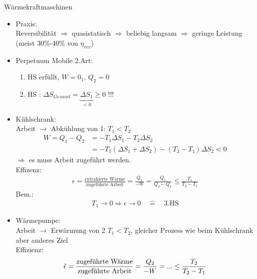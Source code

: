 \begin{beispiel}{Wärmekraftmaschinen}
\begin{itemize}
    \item Praxis:\\
            Reversibilität $\Rightarrow$ quasistatisch $\Rightarrow$ beliebig langsam $\Rightarrow$ geringe Leistung (meist 30\%-40\% von $\eta_{rev}$)
    \item Perpetuum Mobile 2.Art:
    \begin{enumerate}
        \item HS erfüllt, $W=0_1$, $Q_2=0$
        \item HS : $\Delta S_{Gesamt} = \underbrace{\Delta S_1}_{<0} \geq 0$ !!!
    \end{enumerate}
    \item Kühlschrank:\\
        Arbeit $\rightarrow$ Abkühlung von 1: $T_1<T_2$
        \begin{align}
            W=Q_1-Q_2&=-T_1\Delta S_1-T_2\Delta S_2\\
            &= -T_1(\Delta S_1 + \Delta S_2)-(T_2-T_1)\Delta S_2 < 0
        \end{align}
        $\Rightarrow$ es muss Arbeit zugeführt werden.\\
        Effizenz:
        \begin{align}
            \epsilon = \frac{\text{extrahierte Wärme}}{\text{zugeführte Arbeit}}=\frac{Q_1}{-W}=\frac{Q_1}{Q_2-Q_1}\leq \frac{T_1}{T_2-T_1}
        \end{align}
        Bem.:
        \begin{align}
            T_1 \rightarrow 0 \Rightarrow \epsilon \rightarrow 0 \quad\widehat{=} \quad\text{3.HS}
        \end{align}
    \item Wärmepumpe:\\
        Arbeit $\rightarrow$ Erwärmung von 2 $T_1<T_2$, gleicher Prozess wie beim Kühlschrank aber anderes Ziel\\
        Effizienz:
        \begin{align}
            \Tilde{\epsilon}=\frac{\text{zugeführte Wärme}}{\text{zugeführte Arbeit}}=\frac{Q_2}{-W}=...\leq \frac{T_2}{T_2-T_1}
        \end{align}
\end{itemize}
\end{beispiel}
